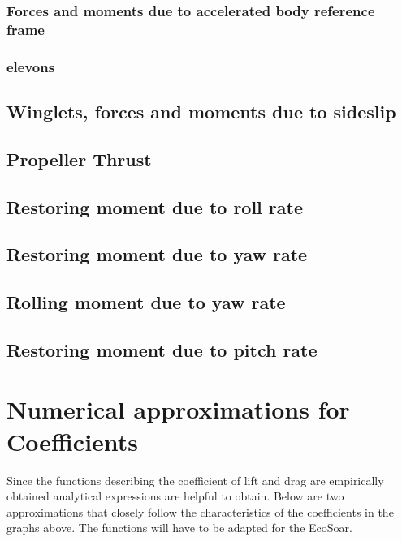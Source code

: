 \documentclass{article}
\begin{document}


\subsubsection{Forces and moments due to accelerated body reference frame}



\subsubsection{elevons}


\subsection{Winglets, forces and moments due to sideslip}


\subsection{Propeller Thrust}


\subsection{Restoring moment due to roll rate}


\subsection{Restoring moment due to yaw rate}


\subsection{Rolling moment due to yaw rate}


\subsection{Restoring moment due to pitch rate}








\section{Numerical approximations for Coefficients}
Since the functions describing the coefficient of lift and drag are empirically obtained analytical expressions are helpful to obtain.
Below are two approximations that closely follow the characteristics of the coefficients in the graphs above.
The functions will have to be adapted for the EcoSoar.
\end{document}
